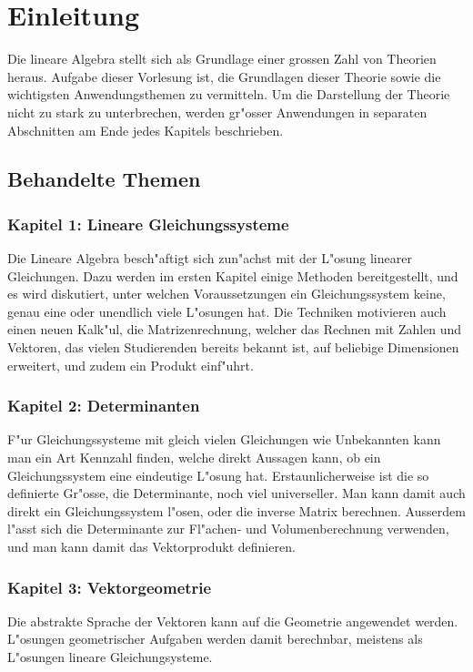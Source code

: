 %
%
%
\chapter*{Einleitung}

Die lineare Algebra stellt sich als Grundlage einer grossen
Zahl von Theorien heraus.
Aufgabe dieser Vorlesung ist, die
Grundlagen dieser Theorie sowie die wichtigsten Anwendungsthemen
zu vermitteln.
Um die Darstellung der Theorie nicht zu stark zu unterbrechen,
werden gr"osser Anwendungen in separaten Abschnitten am Ende
jedes Kapitels beschrieben.

\section*{Behandelte Themen}
\subsection*{Kapitel 1: Lineare Gleichungssysteme}
Die Lineare Algebra besch"aftigt sich zun"achst mit der L"osung linearer
Gleichungen.
Dazu werden im ersten Kapitel einige Methoden bereitgestellt,
und es wird diskutiert, unter welchen Voraussetzungen ein
Gleichungssystem keine, genau eine oder unendlich viele
L"osungen hat.
Die Techniken motivieren auch einen neuen Kalk"ul, die Matrizenrechnung,
welcher das Rechnen mit Zahlen und Vektoren, das vielen
Studierenden bereits bekannt ist, auf beliebige Dimensionen erweitert,
und zudem ein Produkt einf"uhrt.

\subsection*{Kapitel 2: Determinanten}
F"ur Gleichungssysteme mit gleich vielen Gleichungen wie Unbekannten
kann man ein Art Kennzahl finden, welche direkt Aussagen kann,
ob ein Gleichungssystem eine eindeutige L"osung hat.
Erstaunlicherweise ist die so definierte Gr"osse, die Determinante,
noch viel universeller.
Man kann damit auch direkt ein Gleichungssystem l"osen, oder
die inverse Matrix berechnen.
Ausserdem l"asst sich die Determinante zur Fl"achen- und Volumenberechnung
verwenden, und man kann damit das Vektorprodukt definieren.

\subsection*{Kapitel 3: Vektorgeometrie}
Die abstrakte Sprache der Vektoren kann auf die Geometrie angewendet
werden.
L"osungen geometrischer Aufgaben werden damit berechnbar,
meistens als L"osungen lineare Gleichungsysteme.

